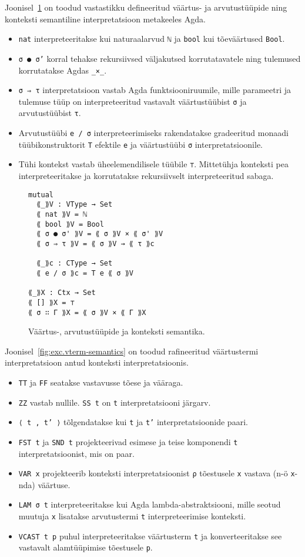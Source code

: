 \documentclass[a4paper,12pt]{article}
\begin{document}
Joonisel~\ref{fig:type-semantics} on toodud vastastikku defineeritud väärtus- ja arvutustüüpide ning konteksti semantiline interpretatsioon metakeeles Agda.
\begin{itemize}
\item {\tt nat} interpreteeritakse kui naturaalarvud {\tt ℕ} ja {\tt bool} kui tõeväärtused {\tt Bool}.
\item {\tt σ ● σ'} korral tehakse rekursiivsed väljakutsed korrutatavatele ning tulemused korrutatakse Agdas {\tt _×_}.
\item {\tt σ ⇒ τ} interpretatsioon vastab Agda funktsiooniruumile, mille parameetri ja tulemuse tüüp on interpreteeritud vastavalt väärtustüübist {\tt σ} ja arvutustüübist {\tt τ}.
\item Arvutustüübi {\tt e / σ} interpreteerimiseks rakendatakse gradeeritud monaadi tüübikonstruktorit {\tt T} efektile {\tt e} ja väärtustüübi {\tt σ} interpretatsioonile.
\item Tühi kontekst vastab üheelemendilisele tüübile {\tt ⊤}. Mittetühja konteksti pea interpreteeritakse ja korrutatakse rekursiivselt interpreteeritud sabaga.
\end{itemize}

\begin{figure}
  \begin{BVerbatim}
mutual
  ⟪_⟫V : VType → Set
  ⟪ nat ⟫V = ℕ
  ⟪ bool ⟫V = Bool
  ⟪ σ ● σ' ⟫V = ⟪ σ ⟫V × ⟪ σ' ⟫V
  ⟪ σ ⇒ τ ⟫V = ⟪ σ ⟫V → ⟪ τ ⟫c

  ⟪_⟫c : CType → Set
  ⟪ e / σ ⟫c = T e ⟪ σ ⟫V

⟪_⟫X : Ctx → Set
⟪ [] ⟫X = ⊤
⟪ σ ∷ Γ ⟫X = ⟪ σ ⟫V × ⟪ Γ ⟫X
  \end{BVerbatim}
  \caption{Väärtus-, arvutustüüpide ja konteksti semantika.}
  \label{fig:type-semantics}
\end{figure}

Joonisel~\ref{fig:exc.vterm-semantics} on toodud rafineeritud väärtustermi interpretatsioon antud konteksti interpretatsioonis.
\begin{itemize}
\item {\tt TT} ja {\tt FF} seatakse vastavusse tõese ja vääraga.
\item {\tt ZZ} vastab nullile. {\tt SS t} on {\tt t} interpretatsiooni järgarv.
\item {\tt ⟨ t , t' ⟩} tõlgendatakse kui {\tt t} ja {\tt t'} interpretatsioonide paari.
\item {\tt FST t} ja {\tt SND t} projekteerivad esimese ja teise komponendi {\tt t} interpretatsioonist, mis on paar.
\item {\tt VAR x} projekteerib konteksti interpretatsioonist {\tt ρ} tõestusele {\tt x} vastava (n-ö {\tt x}-nda) väärtuse.
\item {\tt LAM σ t} interpreteeritakse kui Agda lambda-abstraktsiooni, mille seotud muutuja {\tt x} lisatakse arvutustermi {\tt t} interpreteerimise konteksti.
\item {\tt VCAST t p} puhul interpreteeritakse väärtusterm {\tt t} ja konverteeritakse see vastavalt alamtüüpimise tõestusele {\tt p}.
\end{itemize}
\end{document}
